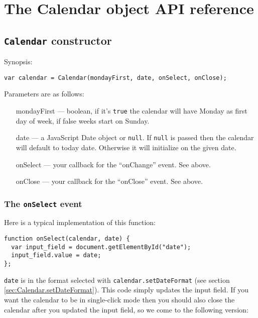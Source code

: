 \documentclass[a4paper,10pt]{article}
\begin{document}
\section{The Calendar object API reference}\label{sec:Calendar_reference}

\subsection{\texttt{Calendar} constructor}\label{sec:Calendar.constructor}

\noindent Synopsis:

\begin{verbatim}
var calendar = Calendar(mondayFirst, date, onSelect, onClose);
\end{verbatim}

Parameters are as follows:

\begin{itemize}

\item [mondayFirst] --- boolean, if it's \texttt{true} the calendar will have
Monday as first day of week, if false weeks start on Sunday.

\item [date] --- a JavaScript Date object or \texttt{null}.  If \texttt{null}
is passed then the calendar will default to today date.  Otherwise it will
initialize on the given date.

\item [onSelect] --- your callback for the ``onChange'' event.  See above.

\item [onClose] --- your callback for the ``onClose'' event.  See above.

\end{itemize}

\subsubsection*{The \texttt{onSelect} event}\label{sec:Calendar.onSelect}

Here is a typical implementation of this function:

\begin{verbatim}
function onSelect(calendar, date) {
  var input_field = document.getElementById("date");
  input_field.value = date;
};
\end{verbatim}

\noindent \texttt{date} is in the format selected with \texttt{calendar.setDateFormat}
(see section \ref{sec:Calendar.setDateFormat}).  This code simply updates the
input field.  If you want the calendar to be in single-click mode then you
should also close the calendar after you updated the input field, so we come to
the following version:
\end{document}
